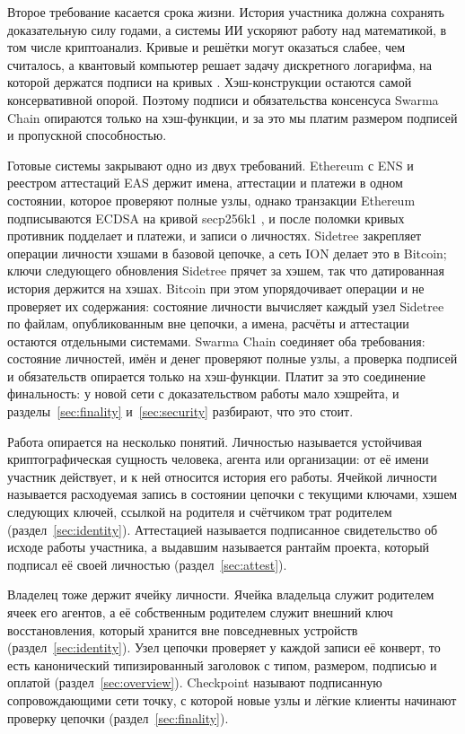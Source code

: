 \documentclass[10pt,a4paper]{article}
\begin{document}
Второе требование касается срока жизни.
История участника должна сохранять доказательную силу годами, а системы ИИ ускоряют работу над математикой, в том числе криптоанализ.
Кривые и решётки могут оказаться слабее, чем считалось, а квантовый компьютер решает задачу дискретного логарифма, на которой держатся подписи на кривых \cite{shor}.
Хэш-конструкции остаются самой консервативной опорой.
Поэтому подписи и обязательства консенсуса Swarma Chain опираются только на хэш-функции, и за это мы платим размером подписей и пропускной способностью.

Готовые системы закрывают одно из двух требований.
Ethereum с ENS \cite{ens} и реестром аттестаций EAS \cite{eas} держит имена, аттестации и платежи в одном состоянии, которое проверяют полные узлы, однако транзакции Ethereum подписываются ECDSA на кривой secp256k1 \cite{ethyellow}, и после поломки кривых противник подделает и платежи, и записи о личностях.
Sidetree \cite{sidetree} закрепляет операции личности хэшами в базовой цепочке, а сеть ION \cite{ion} делает это в Bitcoin; ключи следующего обновления Sidetree прячет за хэшем, так что датированная история держится на хэшах.
Bitcoin при этом упорядочивает операции и не проверяет их содержания: состояние личности вычисляет каждый узел Sidetree по файлам, опубликованным вне цепочки, а имена, расчёты и аттестации остаются отдельными системами.
Swarma Chain соединяет оба требования: состояние личностей, имён и денег проверяют полные узлы, а проверка подписей и обязательств опирается только на хэш-функции.
Платит за это соединение финальность: у новой сети с доказательством работы мало хэшрейта, и разделы~\ref{sec:finality} и~\ref{sec:security} разбирают, что это стоит.

Работа опирается на несколько понятий.
Личностью называется устойчивая криптографическая сущность человека, агента или организации: от её имени участник действует, и к ней относится история его работы.
Ячейкой личности называется расходуемая запись в состоянии цепочки с текущими ключами, хэшем следующих ключей, ссылкой на родителя и счётчиком трат родителем (раздел~\ref{sec:identity}).
Аттестацией называется подписанное свидетельство об исходе работы участника, а выдавшим называется рантайм проекта, который подписал её своей личностью (раздел~\ref{sec:attest}).

Владелец тоже держит ячейку личности.
Ячейка владельца служит родителем ячеек его агентов, а её собственным родителем служит внешний ключ восстановления, который хранится вне повседневных устройств (раздел~\ref{sec:identity}).
Узел цепочки проверяет у каждой записи её конверт, то есть канонический типизированный заголовок с типом, размером, подписью и оплатой (раздел~\ref{sec:overview}).
Checkpoint называют подписанную сопровождающими сети точку, с которой новые узлы и лёгкие клиенты начинают проверку цепочки (раздел~\ref{sec:finality}).
\end{document}
